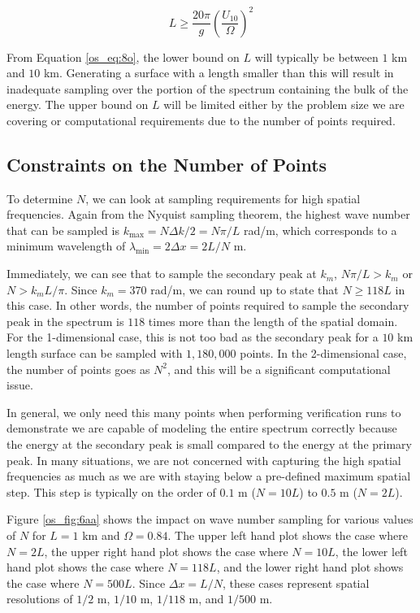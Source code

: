\begin{equation}
\label{os_eq:8o}
\boxed{L \geq \frac{20\pi}{g}\left(\frac{U_{10}}{\Omega} \right)^2}
\end{equation}
\renewcommand{\baselinestretch}{2} \small\normalsize

From Equation \ref{os_eq:8o}, the lower bound on $L$ will typically be between $1$ km and $10$ km. Generating a surface with a length smaller than this will result in inadequate sampling over the portion of the spectrum containing the bulk of the energy. The upper bound on $L$ will be limited either by the problem size we are covering or computational requirements due to the number of points required.

\subsection {Constraints on the Number of Points}
To determine $N$, we can look at sampling requirements for high spatial frequencies. Again from the Nyquist sampling theorem, the highest wave number that can be sampled is $k_{\text{max}} = N\Delta k/2 = N\pi/L$ rad/m, which corresponds to a minimum wavelength of $\lambda_{\text{min}} = 2\Delta x = 2L/N$ m.

Immediately, we can see that to sample the secondary peak at $k_m$, $N\pi/L > k_m$ or $N > k_mL/\pi$. Since $k_m = 370$ rad/m, we can round up to state that $N \geq 118L$ in this case. In other words, the number of points required to sample the secondary peak in the spectrum is $118$ times more than the length of the spatial domain. For the 1-dimensional case, this is not too bad as the secondary peak for a $10$ km length surface can be sampled with $1,180,000$ points. In the 2-dimensional case, the number of points goes as $N^2$, and this will be a significant computational issue.

In general, we only need this many points when performing verification runs to demonstrate we are capable of modeling the entire spectrum correctly because the energy at the secondary peak is small compared to the energy at the primary peak. In many situations, we are not concerned with capturing the high spatial frequencies as much as we are with staying below a pre-defined maximum spatial step. This step is typically on the order of $0.1$ m ($N = 10L$) to $0.5$ m ($N = 2L$).

Figure \ref{os_fig:6aa} shows the impact on wave number sampling for various values of $N$ for $L = 1$ km and $\Omega = 0.84$. The upper left hand plot shows the case where $N = 2L$, the upper right hand plot shows the case where $N = 10L$, the lower left hand plot shows the case where $N = 118L$, and the lower right hand plot shows the case where $N = 500L$. Since $\Delta x = L/N$, these cases represent spatial resolutions of $1/2$ m, $1/10$ m, $1/118$ m, and $1/500$ m. 

